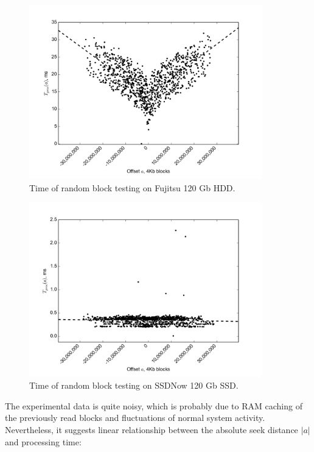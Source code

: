 \documentclass[final,5p,times,twocolumn,authoryear]{elsarticle}
\begin{document}
\begin{figure}
  \centerline{\includegraphics[width=0.9\textwidth]{figures/seek-time-hdd}}
  \caption{Time of random block testing on Fujitsu 120 Gb HDD.}
  \label{fig:seek_time_hdd}
\end{figure}

\begin{figure}
  \centerline{\includegraphics[width=0.9\textwidth]{figures/seek-time-ssd}}
  \caption{Time of random block testing on SSDNow 120 Gb SSD.}
  \label{fig:seek_time_ssd}
\end{figure}

The experimental data is quite noisy, which is probably due to RAM caching of the previously read blocks and fluctuations of normal system activity. Nevertheless, it suggests linear relationship between the absolute seek distance $|a|$ and processing time:
\end{document}
